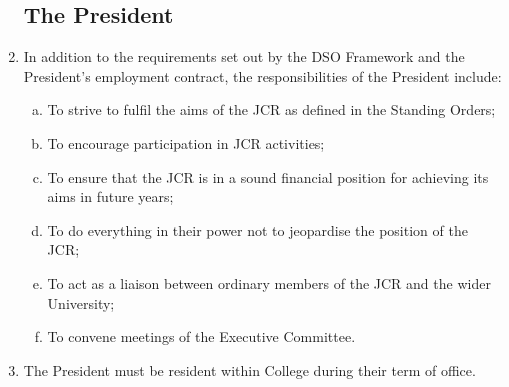 \documentclass[12pt]{article}  %
\begin{document}
\begin{enumerate}
	\subsection{The President}
	\item In addition to the requirements set out by the DSO Framework and the President’s employment contract, the responsibilities of the President include:
	\begin{enumerate}[(a)]
		\item To strive to fulfil the aims of the JCR as defined in the Standing Orders;
		\item To encourage participation in JCR activities;
		\item To ensure that the JCR is in a sound financial position for achieving its aims in future years;
		\item To do everything in their power not to jeopardise the position of the JCR;
		\item To act as a liaison between ordinary members of the JCR and the wider University;
		\item To convene meetings of the Executive Committee.
	\end{enumerate}
	\item The President must be resident within College during their term of office.

\end{enumerate}
\end{document}
